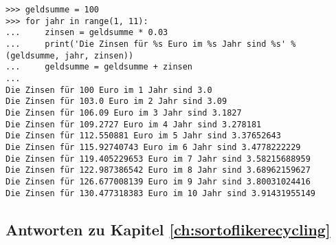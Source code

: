 \begin{listing}
\begin{verbatim}
>>> geldsumme = 100
>>> for jahr in range(1, 11):
...     zinsen = geldsumme * 0.03
...     print('Die Zinsen für %s Euro im %s Jahr sind %s' % (geldsumme, jahr, zinsen))
...     geldsumme = geldsumme + zinsen
... 
Die Zinsen für 100 Euro im 1 Jahr sind 3.0
Die Zinsen für 103.0 Euro im 2 Jahr sind 3.09
Die Zinsen für 106.09 Euro im 3 Jahr sind 3.1827
Die Zinsen für 109.2727 Euro im 4 Jahr sind 3.278181
Die Zinsen für 112.550881 Euro im 5 Jahr sind 3.37652643
Die Zinsen für 115.92740743 Euro im 6 Jahr sind 3.4778222229
Die Zinsen für 119.405229653 Euro im 7 Jahr sind 3.58215688959
Die Zinsen für 122.987386542 Euro im 8 Jahr sind 3.68962159627
Die Zinsen für 126.677008139 Euro im 9 Jahr sind 3.80031024416
Die Zinsen für 130.477318383 Euro im 10 Jahr sind 3.91431955149
\end{verbatim}
\end{listing}

\subsection*{Antworten zu Kapitel \ref{ch:sortoflikerecycling}}

